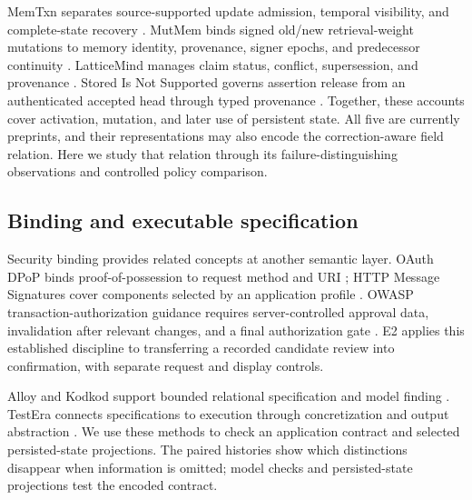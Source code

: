 MemTxn separates source-supported update admission, temporal visibility, and complete-state recovery \citep{cui2026memtxn}. MutMem binds signed old/new retrieval-weight mutations to memory identity, provenance, signer epochs, and predecessor continuity \citep{saidi2026mutmem}. LatticeMind manages claim status, conflict, supersession, and provenance \citep{zhou2026latticemind}. Stored Is Not Supported governs assertion release from an authenticated accepted head through typed provenance \citep{he2026stored}. Together, these accounts cover activation, mutation, and later use of persistent state. All five are currently preprints, and their representations may also encode the correction-aware field relation. Here we study that relation through its failure-distinguishing observations and controlled policy comparison.

\subsection{Binding and executable specification}

Security binding provides related concepts at another semantic layer. OAuth DPoP binds proof-of-possession to request method and URI \citep{fett2023dpop}; HTTP Message Signatures cover components selected by an application profile \citep{backman2024signatures}. OWASP transaction-authorization guidance requires server-controlled approval data, invalidation after relevant changes, and a final authorization gate \citep{owaspTransactionAuthorization}. E2 applies this established discipline to transferring a recorded candidate review into confirmation, with separate request and display controls.

Alloy and Kodkod support bounded relational specification and model finding \citep{jackson2002alloy,torlak2007kodkod}. TestEra connects specifications to execution through concretization and output abstraction \citep{marinov2001testera}. We use these methods to check an application contract and selected persisted-state projections. The paired histories show which distinctions disappear when information is omitted; model checks and persisted-state projections test the encoded contract.
